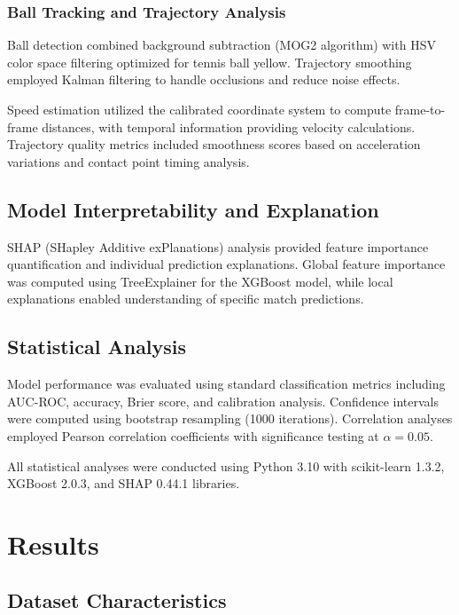 \documentclass[11pt,a4paper]{article}
\begin{document}
\subsubsection{Ball Tracking and Trajectory Analysis}

Ball detection combined background subtraction (MOG2 algorithm) with HSV color space filtering optimized for tennis ball yellow. Trajectory smoothing employed Kalman filtering to handle occlusions and reduce noise effects.

Speed estimation utilized the calibrated coordinate system to compute frame-to-frame distances, with temporal information providing velocity calculations. Trajectory quality metrics included smoothness scores based on acceleration variations and contact point timing analysis.

\subsection{Model Interpretability and Explanation}

SHAP (SHapley Additive exPlanations) analysis \citep{lundberg2017unified} provided feature importance quantification and individual prediction explanations. Global feature importance was computed using TreeExplainer for the XGBoost model, while local explanations enabled understanding of specific match predictions.

\subsection{Statistical Analysis}

Model performance was evaluated using standard classification metrics including AUC-ROC, accuracy, Brier score, and calibration analysis. Confidence intervals were computed using bootstrap resampling (1000 iterations). Correlation analyses employed Pearson correlation coefficients with significance testing at $\alpha=0.05$.

All statistical analyses were conducted using Python 3.10 with scikit-learn 1.3.2, XGBoost 2.0.3, and SHAP 0.44.1 libraries.

\section{Results}

\subsection{Dataset Characteristics}
\end{document}
